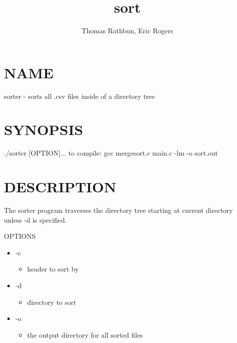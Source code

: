 \documentclass{article}
\title{sort}
\author{Thomas Rathbun, Eric Rogers}
\date{}
\begin{document}
\begin{titlepage}
\maketitle
\end{titlepage}

\section{NAME}
\begin{center}
sorter - sorts all .csv files inside of a directory tree  
\end{center}

\section{SYNOPSIS}
\begin{center} 
./sorter [OPTION]... 
to compile: gcc mergesort.c main.c -lm -o sort.out
\end{center}

\section{DESCRIPTION}
\begin{center} 
The sorter program traverses the directory tree starting at current
directory unless -d is specified.

OPTIONS
\begin{itemize}
\item -c
\begin{itemize}
\item header to sort by
\end{itemize}
\item -d
\begin{itemize}
\item directory to sort
\end{itemize}
\item -o
\begin{itemize}
\item the output directory for all sorted files
\end{itemize}
\end{itemize}
\end{center}
\end{document}
